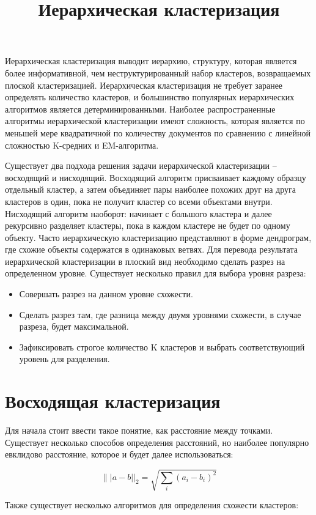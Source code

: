 \documentclass[12pt, a4paper]{article}
\title{Иерархическая кластеризация}
\begin{document}
\maketitle
Иерархическая кластеризация выводит иерархию, структуру, которая является более информативной, чем неструктурированный набор кластеров, возвращаемых плоской кластеризацией. Иерархическая кластеризация не требует заранее определять количество кластеров, и большинство популярных иерархических алгоритмов является детерминированными. Наиболее распространенные алгоритмы иерархической кластеризации имеют сложность, которая является по меньшей мере квадратичной по количеству документов по сравнению с линейной сложностью K-средних и EM-алгоритма.

Существует два подхода решения задачи иерархической кластеризации – восходящий и нисходящий. Восходящий алгоритм присваивает каждому образцу отдельный кластер, 
а затем объединяет пары наиболее похожих друг на друга кластеров в один, пока не получит кластер со всеми объектами внутри. Нисходящий алгоритм наоборот: 
начинает с большого кластера и далее рекурсивно разделяет кластеры, пока в каждом кластере не будет по одному объекту.
Часто иерархическую кластеризацию представляют в форме дендрограм, 
где схожие объекты содержатся в одинаковых ветвях. Для перевода результата иерархической кластеризации в плоский вид необходимо сделать разрез на определенном уровне. Существует несколько правил для выбора уровня разреза:

\begin{itemize}
\item Совершать разрез на данном уровне схожести.
\item Сделать разрез там, где разница между двумя уровнями схожести, в случае разреза, будет максимальной.
\item Зафиксировать строгое количество K кластеров и выбрать соответствующий уровень для разделения.
\end{itemize}
   
\section*{Восходящая кластеризация}
Для начала стоит ввести такое понятие, как расстояние между точками. Существует несколько способов определения расстояний, но наиболее популярно евклидово расстояние, которое и будет далее использоваться:

\[
\||a-b||_2 = \sqrt{\sum_i (a_i-b_i)^2}
\]

Также существует несколько алгоритмов для определения схожести кластеров:
\end{document}
